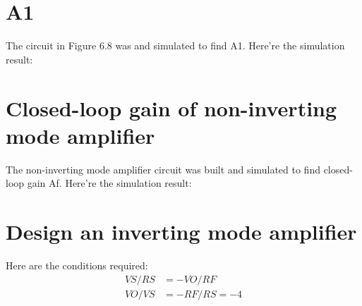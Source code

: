 \documentclass[letterpaper]{article} %
\begin{document}
\section{A1}
The circuit in Figure 6.8 was and simulated to find A1. Here're the simulation result:

\begin{minipage}{1.0\textwidth}
\centering
{}
\centering
\end{minipage}
\bigskip

\section{Closed-loop gain of non-inverting mode amplifier}

The non-inverting mode amplifier circuit was built and simulated to find closed-loop gain Af. Here're the simulation result:


\section{Design an inverting mode amplifier}

Here are the conditions required:
\begin{align*}
VS/RS&=-VO/RF\\
VO/VS&=-RF/RS=-4\\
\end{align*}
\end{document}
